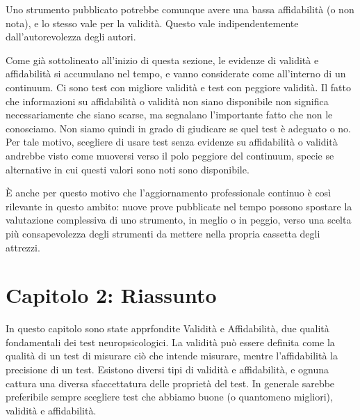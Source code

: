 \documentclass[
  italian,
  letterpaper,
  paper=6in:9in,
  pagesize=pdftex,
  headinclude=on,
  footinclude=on,
  11pt]{scrbook}
\begin{document}
\begin{tcolorbox}[enhanced jigsaw, title=\textcolor{quarto-callout-important-color}{\faExclamation}\hspace{0.5em}{Il fatto che un test sia pubblicato non garantisce che abbia validità e
affidabilità sufficienti.}, coltitle=black, bottomtitle=1mm, colback=white, bottomrule=.15mm, rightrule=.15mm, breakable, toptitle=1mm, left=2mm, colbacktitle=quarto-callout-important-color!10!white, titlerule=0mm, colframe=quarto-callout-important-color-frame, leftrule=.75mm, opacitybacktitle=0.6, arc=.35mm, toprule=.15mm, opacityback=0]

Uno strumento pubblicato potrebbe comunque avere una bassa affidabilità
(o non nota), e lo stesso vale per la validità. Questo vale
indipendentemente dall'autorevolezza degli autori.

\end{tcolorbox}

Come già sottolineato all'inizio di questa sezione, le evidenze di
validità e affidabilità si accumulano nel tempo, e vanno considerate
come all'interno di un continuum. Ci sono test con migliore validità e
test con peggiore validità. Il fatto che informazioni su affidabilità o
validità non siano disponibile non significa necessariamente che siano
scarse, ma segnalano l'importante fatto che non le conosciamo. Non siamo
quindi in grado di giudicare se quel test è adeguato o no. Per tale
motivo, scegliere di usare test senza evidenze su affidabilità o
validità andrebbe visto come muoversi verso il polo peggiore del
continuum, specie se alternative in cui questi valori sono noti sono
disponibile.

È anche per questo motivo che l'aggiornamento professionale continuo è
così rilevante in questo ambito: nuove prove pubblicate nel tempo
possono spostare la valutazione complessiva di uno strumento, in meglio
o in peggio, verso una scelta più consapevolezza degli strumenti da
mettere nella propria cassetta degli attrezzi.

\section{Capitolo 2: Riassunto}\label{capitolo-2-riassunto}

In questo capitolo sono state apprfondite Validità e Affidabilità, due
qualità fondamentali dei test neuropsicologici. La validità può essere
definita come la qualità di un test di misurare ciò che intende
misurare, mentre l'affidabilità la precisione di un test. Esistono
diversi tipi di validità e affidabilità, e ognuna cattura una diversa
sfaccettatura delle proprietà del test. In generale sarebbe preferibile
sempre scegliere test che abbiamo buone (o quantomeno migliori),
validità e affidabilità.
\end{document}

